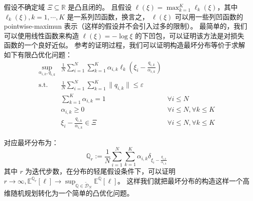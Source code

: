 假设不确定域 $\Xi\subseteq \mathbb{R}$ 是凸且闭的。
且假设 $\ell(\xi) = \max_{k=1}^K \ell_k(\xi)$，其中 $\ell_k(\xi), k = 1, \cdots, K$ 是一系列凹函数，换言之，
$\ell(\xi)$ 可以用一些列凹函数的 pointwise-maximun 表示（这样的假设并不会引入过多的限制）。
最简单的，我们可以使用线性函数来构造 $\ell(\xi) =  - \log \xi$ 的下凹包，可以证明该方法是对损失函数的一个良好近似。
参考\citep{Esfahani2018Data}的证明过程，我们可以证明构造最坏分布等价于求解如下有限凸优化问题：
\begin{equation}
    \begin{aligned}\sup_{\alpha_{i,k}, q_{i,k}} &  \frac1N \sum_{i=1}^N \sum_{k=1}^K \alpha_{i,k} \ell_{k} (\xi_i - \frac{q_{i,k}}{\alpha_{i,k}}) \\ \text{s.t.} & \frac1N \sum_{i=1}^N\sum_{k=1}^K \| q_{i,k} \| \leq \varepsilon \\ & \sum_{k=1}^K \alpha_{i,k} = 1 & \forall i \leq N \\ & \alpha_{i,k} \geq 0 & \forall i\leq N, \forall k \leq K \\  & \xi_i - \frac{q_{i,k}}{\alpha_{i,k}} \in \Xi & \forall i \leq N, \forall k \leq K \end{aligned}
\end{equation}




对应最坏分布为：
\begin{equation}
    \mathbb{Q}_r := \frac1N \sum_{i=1}^N \sum_{k=1}^K \alpha_{i,k} \delta_{\xi_i - \frac{q_{i,k}}{\alpha_{i,k}}}
\end{equation}
其中 $r$ 为迭代步数，在分布的轻尾假设条件下，可以证明 $r\to \infty, \mathbb{E}^{\mathbb{Q}_r} [\ell] \to\sup_{\mathbb{Q} \in \tilde{\mathcal{D}}_N} \mathbb{E}^{\mathbb{Q}} [\ell]$。
这样我们就把最坏分布的构造这样一个高维随机规划转化为一个简单的凸优化问题。

